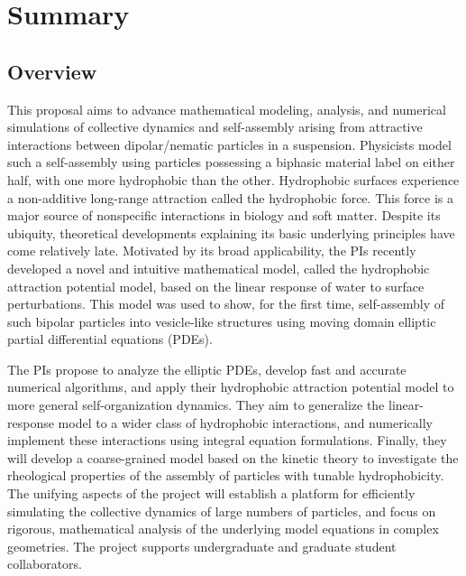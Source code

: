 \documentclass[10pt]{article}
\begin{document}
\section*{Summary}


\subsection*{Overview}
\vspace{-0.1in}
This proposal aims to advance mathematical modeling, analysis, and
numerical simulations of collective dynamics and self-assembly arising
from attractive interactions between dipolar/nematic particles in a
suspension. Physicists model such a self-assembly using particles
possessing a biphasic material label on either half, with one more
hydrophobic than the other. Hydrophobic surfaces experience a
non-additive long-range attraction called the hydrophobic force. This
force is a major source of nonspecific interactions in biology and soft
matter. Despite its ubiquity, theoretical developments explaining its
basic underlying principles have come relatively late. Motivated by its
broad applicability, the PIs recently developed a novel and intuitive
mathematical model, called the hydrophobic attraction potential model,
based on the linear response of water to surface perturbations. This
model was used to show, for the first time, self-assembly of such
bipolar particles into vesicle-like structures using moving domain
elliptic partial differential equations (PDEs).

The PIs propose to analyze the elliptic PDEs, develop fast and accurate
numerical algorithms, and apply their hydrophobic attraction potential
model to more general self-organization dynamics. They aim to generalize
the linear-response model to a wider class of hydrophobic interactions,
and numerically implement these interactions using integral equation
formulations. Finally, they will develop a coarse-grained model based on
the kinetic theory to investigate the rheological properties of the
assembly of particles with tunable hydrophobicity. The unifying aspects
of the project will establish a platform for efficiently simulating the
collective dynamics of large numbers of particles, and focus on
rigorous, mathematical analysis of the underlying model equations in
complex geometries. The project supports undergraduate and graduate
student collaborators.
\end{document}
